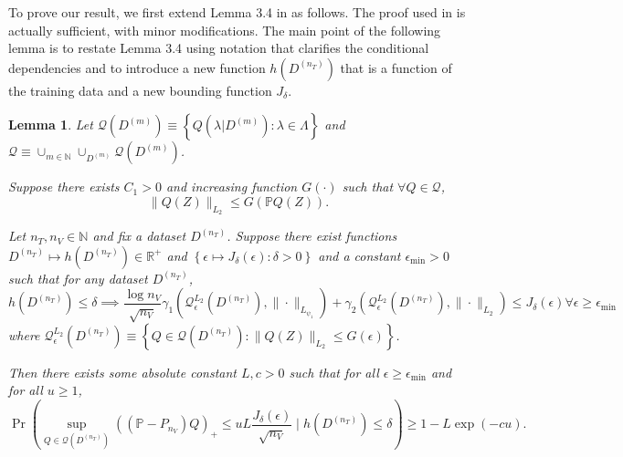 \documentclass[10pt]{book}
\newtheorem{lemma}{Lemma}
\theoremstyle{definition}
\begin{document}
To prove our result, we first extend Lemma 3.4 in \citet{lecue2012oracle} as follows.
The proof used in \citet{lecue2012oracle} is actually sufficient, with minor modifications.
The main point of the following lemma is to restate Lemma 3.4 using notation that clarifies the conditional dependencies and to introduce a new function $h(D^{(n_T)})$ that is a function of the training data and a new bounding function $J_\delta$.
\begin{lemma}
Let $\mathcal{Q}(D^{(m)})\equiv\left\{ Q(\lambda|D^{(m)}):\lambda\in\Lambda\right\} $
and $\mathcal{Q}\equiv\cup_{m\in\mathbb{N}}\cup_{D^{(m)}}\mathcal{Q}(D^{(m)})$.

Suppose there exists $C_{1}>0$ and increasing function $G(\cdot)$
such that $\forall Q\in\mathcal{Q}$, 
\[
\|Q(Z)\|_{L_{2}}\le G\left(\mathbb{P}Q(Z)\right).
\]


Let $n_{T},n_{V}\in\mathbb{N}$ and fix a dataset $D^{(n_{T})}$.
Suppose there exist functions $D^{(n_{T})}\mapsto h(D^{(n_{T})})\in\mathbb{R}^{+}$
and $\left\{ \epsilon\mapsto J_{\delta}(\epsilon):\delta>0\right\} $
and a constant $\epsilon_{\min}>0$ such that for any dataset $D^{(n_{T})}$,
\[
h(D^{(n_{T})})\le\delta\implies\frac{\log n_{V}}{\sqrt{n_{V}}}\gamma_{1}\left(\mathcal{Q}_{\epsilon}^{L_{2}}(D^{(n_{T})}),\|\cdot\|_{L_{\psi_{1}}}\right)+\gamma_{2}\left(\mathcal{Q}_{\epsilon}^{L_{2}}(D^{(n_{T})}),\|\cdot\|_{L_{2}}\right)\le J_{\delta}(\epsilon)\forall\epsilon\ge\epsilon_{\min}
\]
where $\mathcal{Q}_{\epsilon}^{L_{2}}(D^{(n_{T})})\equiv\left\{ Q\in\mathcal{Q}(D^{(n_{T})}):\|Q(Z)\|_{L_{2}}\le G(\epsilon)\right\} $.

Then there exists some absolute constant $L,c>0$ such that for all
$\epsilon\ge\epsilon_{\min}$ and for all $u\ge1$,
\[
\Pr\left(\sup_{Q\in\mathcal{Q}(D^{(n_{T})})}\left(\left(\mathbb{P}-P_{n_{V}}\right)Q\right)_{+}\le uL\frac{J_{\delta}(\epsilon)}{\sqrt{n_{V}}}\mid h\left(D^{(n_{T})}\right)\le\delta\right)\ge1-L\exp(-cu).
\]
\end{lemma}
\end{document}
